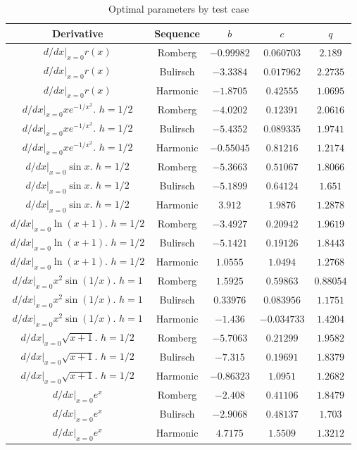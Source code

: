 \begin{table}[H]
    \centering
    \begin{tabular}{c|c||c|c|c}
        Derivative & Sequence & \(b\) & \(c\) & \(q\) \\\hline\hline
$d/dx|_{x=0}r(x)$ & Romberg & \(-0.99982\) & \(0.060703\) & \(2.189\) \\
$d/dx|_{x=0}r(x)$ & Bulirsch & \(-3.3384\) & \(0.017962\) & \(2.2735\) \\
$d/dx|_{x=0}r(x)$ & Harmonic & \(-1.8705\) & \(0.42555\) & \(1.0695\) \\
$d/dx|_{x=0}xe^{-1/x^2}$. $h=1/2$ & Romberg & \(-4.0202\) & \(0.12391\) & \(2.0616\) \\
$d/dx|_{x=0}xe^{-1/x^2}$. $h=1/2$ & Bulirsch & \(-5.4352\) & \(0.089335\) & \(1.9741\) \\
$d/dx|_{x=0}xe^{-1/x^2}$. $h=1/2$ & Harmonic & \(-0.55045\) & \(0.81216\) & \(1.2174\) \\
$d/dx|_{x=0}\sin x$. $h=1/2$ & Romberg & \(-5.3663\) & \(0.51067\) & \(1.8066\) \\
$d/dx|_{x=0}\sin x$. $h=1/2$ & Bulirsch & \(-5.1899\) & \(0.64124\) & \(1.651\) \\
$d/dx|_{x=0}\sin x$. $h=1/2$ & Harmonic & \(3.912\) & \(1.9876\) & \(1.2878\) \\
$d/dx|_{x=0} \ln(x + 1)$. $h=1/2$ & Romberg & \(-3.4927\) & \(0.20942\) & \(1.9619\) \\
$d/dx|_{x=0} \ln(x + 1)$. $h=1/2$ & Bulirsch & \(-5.1421\) & \(0.19126\) & \(1.8443\) \\
$d/dx|_{x=0} \ln(x + 1)$. $h=1/2$ & Harmonic & \(1.0555\) & \(1.0494\) & \(1.2768\) \\
$d/dx|_{x=0} x^2 \sin(1/x)$. $h=1$ & Romberg & \(1.5925\) & \(0.59863\) & \(0.88054\) \\
$d/dx|_{x=0} x^2 \sin(1/x)$. $h=1$ & Bulirsch & \(0.33976\) & \(0.083956\) & \(1.1751\) \\
$d/dx|_{x=0} x^2 \sin(1/x)$. $h=1$ & Harmonic & \(-1.436\) & \(-0.034733\) & \(1.4204\) \\
$d/dx|_{x=0} \sqrt{x + 1}$. $h=1/2$ & Romberg & \(-5.7063\) & \(0.21299\) & \(1.9582\) \\
$d/dx|_{x=0} \sqrt{x + 1}$. $h=1/2$ & Bulirsch & \(-7.315\) & \(0.19691\) & \(1.8379\) \\
$d/dx|_{x=0} \sqrt{x + 1}$. $h=1/2$ & Harmonic & \(-0.86323\) & \(1.0951\) & \(1.2682\) \\
$d/dx|_{x=0}e^x$ & Romberg & \(-2.408\) & \(0.41106\) & \(1.8479\) \\
$d/dx|_{x=0}e^x$ & Bulirsch & \(-2.9068\) & \(0.48137\) & \(1.703\) \\
$d/dx|_{x=0}e^x$ & Harmonic & \(4.7175\) & \(1.5509\) & \(1.3212\) \\
    \end{tabular}
    \caption{Optimal parameters by test case}
    \label{tab:my_label}
\end{table}

